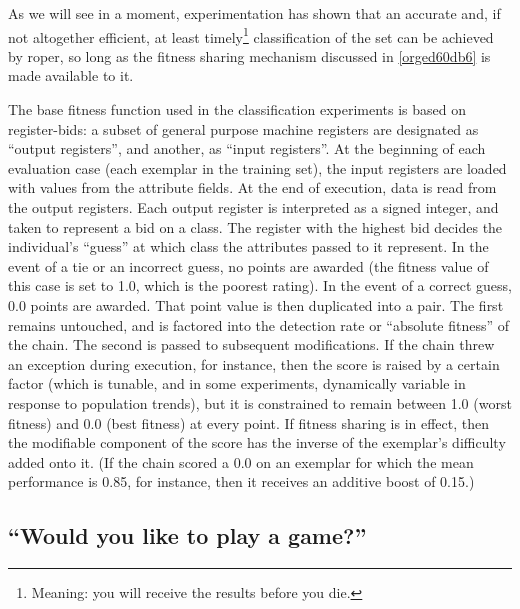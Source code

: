 \documentclass[12pt,glossary]{dalthesis}
\begin{document}
As we will see in a moment, experimentation has shown that an accurate and, if not
altogether efficient, at least timely\footnote{Meaning: you will receive the results before you die.} classification of the set can be achieved by
\gls{roper}, so long as the fitness sharing mechanism discussed in \ref{orged60db6}
is made available to it. 

The base fitness function used in the classification experiments is based on
register-bids: a subset of general purpose machine registers are designated
as ``output registers'', and another, as ``input registers''. At the beginning of
each evaluation case (each exemplar in the training set), the input registers
are loaded with values from the attribute fields. At the end of execution,
data is read from the output registers. Each output register is interpreted
as a signed integer, and taken to represent a bid on a class. The register
with the highest bid decides the individual's ``guess'' at which class the
attributes passed to it represent. In the event of a tie or an incorrect
guess, no points are awarded (the fitness value of this case is set to 1.0,
which is the poorest rating). In the event of a correct guess, 0.0 points
are awarded. That point value is then duplicated into a pair. The first
remains untouched, and is factored into the detection rate or ``absolute
fitness'' of the chain. The second is passed to subsequent modifications.
If the chain threw an exception during execution, for instance, then the
score is raised by a certain factor (which is tunable, and in some experiments,
dynamically variable in response to population trends), but it is constrained
to remain between 1.0 (worst fitness) and 0.0 (best fitness) at every point.
If fitness sharing is in effect, then the modifiable component of the score
has the inverse of the exemplar's difficulty added onto it. (If the chain
scored a 0.0 on an exemplar for which the mean performance is 0.85, for instance,
then it receives an additive boost of 0.15.)



\subsection{``Would you like to play a game?''}
\label{sec:orgdc25d49}
\label{org7b78e59}
\end{document}
